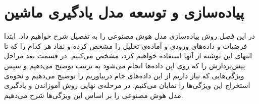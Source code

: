 \chapter{پیاده‌سازی و توسعه مدل یادگیری ماشین}

در این فصل روش پیاده‌سازی مدل هوش مصنوعی را به تفصیل شرح خواهیم داد. ابتدا فرضیات و داده‌های ورودی و آماده‌ی تحلیل را مشخص کرده و نماد هر کدام را که تا انتهای این نوشته از آنها استفاده خواهیم کرد، مشخص می‌کنیم. در قسمت بعد مراحل پیش‌پردازش را که روی این داده‌ها انجام می‌شود به ترتیب توضیح می‌دهیم و سپس ویژگی‌هایی که نیاز داریم از این داده‌های خام دربیاوریم را توضیح می‌دهیم و نحوه‌ی استخراج این ویژگی‌ها را نمایان می‌کنیم. در مرحله‌ی نهایی روش آموزاندن و یادگیری مدل هوش مصنوعی را بر اساس این ویژگی‌ها شرح می‌دهیم.